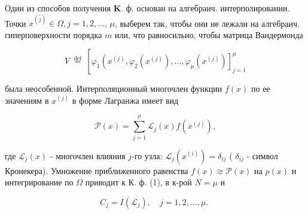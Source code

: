 \documentclass[10pt]{article}
\begin{document}
Один из способов получения $\boldsymbol{K}$. ф. основан на алгебраич. интерполировании. Точки $x^{(\hat{j})} \in \Omega, j=1,2, \ldots$, $\mu$, выберем так, чтобы они не лежали на алгебраич. гиперповерхности порядка $m$ или, что равносильно, чтобы матрица Вандермонда



\[

V \stackrel{\text { def }}{=}\left[\varphi_{1}\left(x^{(j)}, \varphi_{2}\left(x^{(j)}\right), \ldots, \varphi_{\mu}\left(x^{(j)}\right)\right]_{j=1}^{\mu}\right.

\]



была неособенной. Интерполяционный многочлен функции $f(x)$ по ее значениям в $x^{(j)}$ в форме Лагранжа имеет вид



\[

\mathscr{P}(x)=\sum_{j=1}^{\mu} \mathscr{L}_{j}(x) f\left(x^{(j)}\right),

\]



где $\mathscr{L}_{j}(x)$ - многочлен влияния $j$-го узла: $\mathscr{L}_{j}\left(x^{(i)}\right)=\delta_{i j}$ ( $\delta_{i j}$ - символ Кронекера). Умножение приближенного равенства $f(x) \cong \mathscr{P}(x)$ на $p(x)$ и интегрирование по $\Omega$ приводит к К. ф. (1), в к-рой $N=\mu$ и



\[

C_{j}=I\left(\mathscr{L}_{j}\right), \quad j=1,2, \ldots, \mu \text {. }

\]
\end{document}
